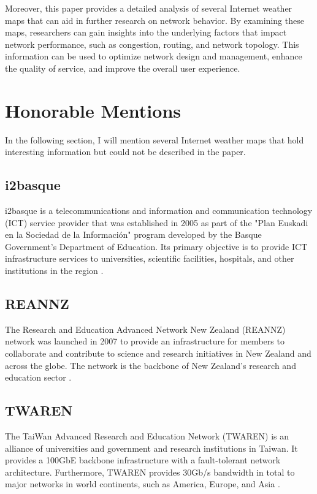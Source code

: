 \documentclass[sigconf,authorversion,nonacm]{acmart}
\begin{document}
Moreover, this paper provides a detailed analysis of several Internet weather maps that can aid in further research on network behavior. By examining these maps, researchers can gain insights into the underlying factors that impact network performance, such as congestion, routing, and network topology. This information can be used to optimize network design and management, enhance the quality of service, and improve the overall user experience.




\appendix

\section{Honorable Mentions}
In the following section, I will mention several Internet weather maps that hold interesting information but could not be described in the paper.
\subsection{i2basque}
i2basque is a telecommunications and information and communication technology (ICT) service provider that was established in 2005 as part of the "Plan Euskadi en la Sociedad de la Información" program developed by the Basque Government's Department of Education. Its primary objective is to provide ICT infrastructure services to universities, scientific facilities, hospitals, and other institutions in the region \cite{i2basque}.
\subsection{REANNZ}
The Research and Education Advanced Network New Zealand (REANNZ) network was launched in 2007 to provide an infrastructure for members to collaborate and contribute to science and research initiatives in New Zealand and across the globe. The network is the backbone of New Zealand's research and education sector \cite{REANNZ}.
\subsection{TWAREN}
The TaiWan Advanced Research and Education Network (TWAREN) is an alliance of universities and government and research institutions in Taiwan. It provides a 100GbE backbone infrastructure with a fault-tolerant network architecture. Furthermore, TWAREN provides 30Gb/s bandwidth in total to major networks in world continents, such as America, Europe, and Asia \cite{TWAREN}.
\end{document}
